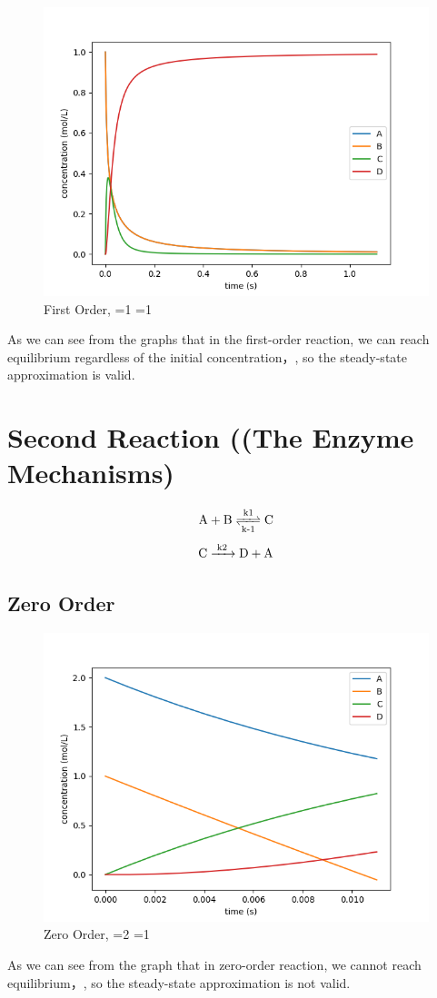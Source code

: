 \documentclass{article}
\begin{document}
\begin{figure}[H]
\centering
\includegraphics[scale=0.6]{1. first 1 1.png}
\caption{First Order, =1 =1}
\end{figure}
As we can see from the graphs that in the first-order reaction, we can reach equilibrium regardless of the initial concentration，, so the steady-state approximation is valid.


\section{Second Reaction ((The Enzyme Mechanisms)}
\begin{equation}
    \ce{A + B <=>T[k1][k-1] C}
\end{equation}
\begin{equation}
    \ce{C ->T[k2] D + A}
\end{equation}
\subsection{Zero Order}
\begin{figure}[H]
\centering
\includegraphics[scale=0.6]{2. zero.png}
\caption{Zero Order, =2 =1}
\end{figure}
As we can see from the graph that in zero-order reaction, we cannot reach equilibrium，, so the steady-state approximation is not valid.
\end{document}
